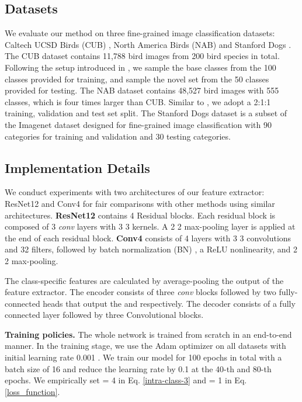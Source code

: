 \documentclass[10pt,twocolumn,letterpaper]{article}
\begin{document}
  \subsection{Datasets} 
  We evaluate our method on three fine-grained image classification datasets: Caltech UCSD Birds (CUB) \cite{cub}, North America Birds (NAB) \cite{nab} and Stanford Dogs \cite{dog}.
The CUB dataset contains 11,788 bird images from 200 bird species in total.
Following the setup introduced in \cite{cub}, we sample the base classes from the 100 classes provided for training, and sample the novel set from the 50 classes provided for testing.
The NAB dataset  contains 48,527 bird images with 555 classes, which is four times larger than CUB. Similar to \cite{metair_gan}, we adopt a 2:1:1 training, validation and test set split.
The Stanford Dogs dataset is a subset of the Imagenet dataset designed for fine-grained image classification with 90 categories for training and validation and 30 testing categories.
     
     \subsection{Implementation Details}
      We conduct experiments with two architectures of our feature extractor: ResNet12 and Conv4 for fair comparisons with other methods using similar architectures.
      \textbf{ResNet12} \cite{resnet} contains 4 Residual blocks. Each residual block is composed of 3 \textit{conv} layers with 3  3 kernels.
      A 2  2 max-pooling layer is applied at the end of each residual block.  
      \textbf{Conv4} consists of 4 layers with 3  3 convolutions
      and 32 filters, followed by batch normalization (BN) ,
      a ReLU nonlinearity, and 2  2 max-pooling.
      
The class-specific features are calculated by average-pooling the output of the feature extractor.
The encoder consists of three \textit{conv} blocks followed by two fully-connected heads that output the  and  respectively.
The decoder consists of a fully connected layer followed by three Convolutional blocks.




     


      \textbf{Training policies.} The whole network is trained from scratch in an end-to-end manner. In the training stage, we use
      the Adam optimizer \cite{adam_optimizer} on all datasets with initial learning rate 0.001
      . 
      We train our model for 100 epochs in total with
      a batch size of 16 and reduce the learning rate by 0.1 at the 40-th and 80-th epochs. 
      We empirically set  = 4 in Eq. \ref{intra-class-3} and  = 1 in Eq.\ref{loss_function}. 
      
\end{document}
